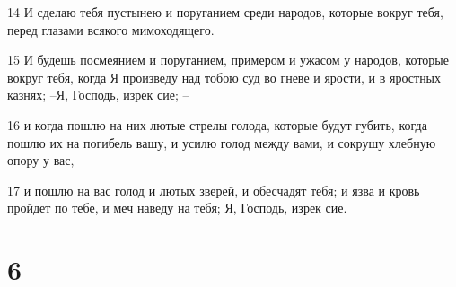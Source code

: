\par 14 И сделаю тебя пустынею и поруганием среди народов, которые вокруг тебя, перед глазами всякого мимоходящего.
\par 15 И будешь посмеянием и поруганием, примером и ужасом у народов, которые вокруг тебя, когда Я произведу над тобою суд во гневе и ярости, и в яростных казнях; --Я, Господь, изрек сие; --
\par 16 и когда пошлю на них лютые стрелы голода, которые будут губить, когда пошлю их на погибель вашу, и усилю голод между вами, и сокрушу хлебную опору у вас,
\par 17 и пошлю на вас голод и лютых зверей, и обесчадят тебя; и язва и кровь пройдет по тебе, и меч наведу на тебя; Я, Господь, изрек сие.

\chapter{6}

